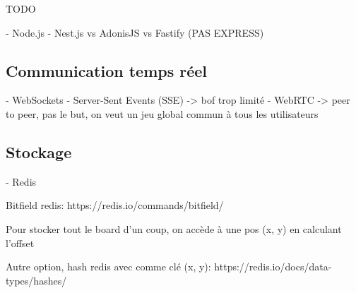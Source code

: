 TODO

- Node.js
- Nest.js vs AdonisJS vs Fastify (PAS EXPRESS)

\subsection{Communication temps réel}

- WebSockets
- Server-Sent Events (SSE) -> bof trop limité
- WebRTC -> peer to peer, pas le but, on veut un jeu global commun à tous les utilisateurs

\subsection{Stockage}

- Redis

Bitfield redis: https://redis.io/commands/bitfield/

Pour stocker tout le board d'un coup, on accède à une pos (x, y) en calculant l'offset

Autre option, hash redis avec comme clé (x, y): https://redis.io/docs/data-types/hashes/

